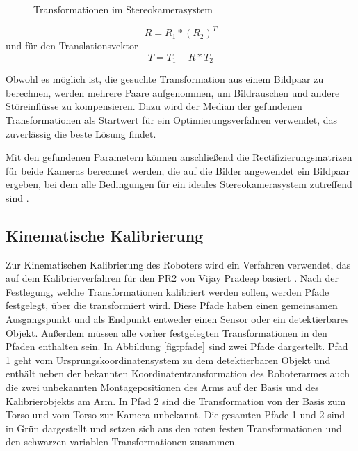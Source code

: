 \begin{figure}[htpb] \centering \def\svgwidth{\textwidth}
   \caption{Transformationen im
  Stereokamerasystem} \label{fig:StereoTrans} \end{figure}


\begin{equation} R=R_1*(R_2)^T \end{equation} und für den Translationsvektor
\begin{equation} T=T_1-R*T_2 \end{equation}

Obwohl es möglich ist, die gesuchte Transformation aus einem Bildpaar zu
berechnen, werden mehrere Paare aufgenommen, um Bildrauschen und andere
Störeinflüsse zu kompensieren. Dazu wird der Median der gefundenen
Transformationen als Startwert für ein Optimierungsverfahren verwendet, das
zuverlässig die beste Lösung findet.

Mit den gefundenen Parametern können anschließend die Rectifizierungsmatrizen
für beide Kameras berechnet werden, die auf die Bilder angewendet ein Bildpaar
ergeben, bei dem alle Bedingungen für ein ideales Stereokamerasystem zutreffend
sind \cite{Bradski2008}.



\subsection{Kinematische Kalibrierung} %

\label{sub:Kinematische Kalibrierung}

Zur Kinematischen Kalibrierung des Roboters wird ein Verfahren
verwendet, das auf dem Kalibrierverfahren für den PR2 von Vijay Pradeep basiert
\cite{Pradeep2010}.
Nach der Festlegung, welche Transformationen kalibriert werden sollen, werden
Pfade festgelegt, über die transformiert wird. Diese Pfade haben einen
gemeinsamen Ausgangspunkt und als Endpunkt entweder einen Sensor oder ein
detektierbares Objekt. Außerdem müssen alle vorher festgelegten
Transformationen in den Pfaden enthalten sein. In Abbildung \ref{fig:pfade}
sind zwei Pfade dargestellt. Pfad 1 geht vom Ursprungskoordinatensystem zu dem
detektierbaren Objekt und enthält neben der bekannten Koordinatentransformation
des Roboterarmes auch die zwei unbekannten Montagepositionen des Arms auf der
Basis und des Kalibrierobjekts am Arm. In Pfad 2 sind die Transformation von
der Basis zum Torso und vom Torso zur Kamera unbekannt. Die gesamten Pfade 1 und
2 sind in Grün dargestellt und setzen sich aus den roten festen Transformationen
und den schwarzen variablen Transformationen zusammen.

